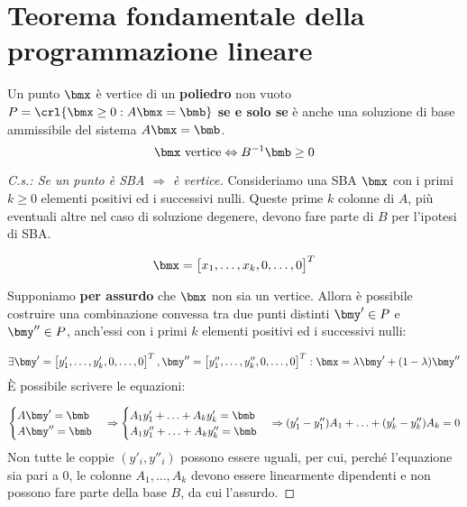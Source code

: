 \documentclass[\main/main.tex]{subfiles}
\begin{document}
\section{Teorema fondamentale della programmazione lineare}

\begin{theorem}
  Un punto $\bmx$ è vertice di un \textbf{poliedro} non vuoto $P=\crl{\bmx \geq 0 : A\bmx = \bmb}$ \textbf{se e solo se} è anche una soluzione di base ammissibile del sistema $A\bmx = \bmb$.
  \[
    \bmx \text{ vertice} \Leftrightarrow B^{-1}\bmb\geq 0
  \]
\end{theorem}

\begin{proof}[C.s.: Se un punto è SBA $\Rightarrow$ è vertice]
  Consideriamo una SBA $\bmx$ con i primi $k \geq 0$ elementi positivi ed i successivi nulli. Queste prime $k$ colonne di $A$, più eventuali altre nel caso di soluzione degenere, devono fare parte di $B$ per l'ipotesi di SBA.

  \[
    \bmx = \begin{bmatrix}
      x_1, \ldots, x_k, 0, \ldots, 0
    \end{bmatrix}^T
  \]

  Supponiamo \textbf{per assurdo} che $\bmx$ non sia un vertice. Allora è possibile costruire una combinazione convessa tra due punti distinti $\bmy' \in P$ e $\bmy'' \in P$, anch'essi con i primi $k$ elementi positivi ed i successivi nulli:

  \[
    \exists \bmy' = \begin{bmatrix}
      y'_1, \ldots, y'_k, 0, \ldots, 0
    \end{bmatrix}^T,
    \bmy'' = \begin{bmatrix}
      y''_1, \ldots, y''_k, 0, \ldots, 0
    \end{bmatrix}^T:
    \bmx = \lambda \bmy' + (1-\lambda)\bmy''
  \]
  È possibile scrivere le equazioni:

  \[
    \begin{cases}
      A\bmy' = \bmb  \\
      A\bmy'' = \bmb \\
    \end{cases}
    \Rightarrow
    \begin{cases}
      A_1y'_1 + \ldots + A_ky'_k = \bmb   \\
      A_1y''_1 + \ldots + A_ky''_k = \bmb \\
    \end{cases}
    \Rightarrow
    (y'_1 - y''_1)A_1 + \ldots + (y'_k -y''_k)A_k = 0
  \]
  Non tutte le coppie $(y'_i, y''_i)$ possono essere uguali, per cui, perché l'equazione sia pari a $0$, le colonne $A_1, \ldots, A_k$ devono essere linearmente dipendenti e non possono fare parte della base $B$, da cui l'assurdo.
\end{proof}
\end{document}
